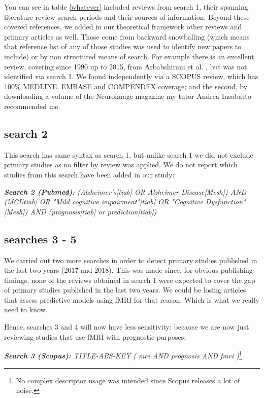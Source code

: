 You can see in table \ref{whatever} included reviews from search 1, their spanning literature-review search periods and their sources of information. Beyond these covered references, we added in our theoretical framework other reviews and primary articles as well. Those come from backward snowballing (which means that reference list of any of those studies was used to identify new papers to include) or by non structured means of search. For example there is an excellent review, covering since 1990 up to 2015, from Arbabshirani et al.                                           \cite{Arbabshirani2017137}, but was not identified via search 1. We found independently via a SCOPUS review, which has 100\% MEDLINE, EMBASE and COMPENDEX coverage; and the second, by downloading a volume of the Neuroimage magazine my tutor Andrea Insabatto recommended me.

\subsection{search 2}
	
This search has same syntax as search 1, but unlike search 1 we did not exclude primary studies as no filter by review was applied. We do not report which studies from this search have been added in our study:
	
		\noindent \textit{\textbf{Search 2 (Pubmed):} (Alzheimer's[tiab] OR Alzheimer Disease[Mesh]) AND (MCI[tiab] OR "Mild cognitive impairment"[tiab] OR "Cognitive Dysfunction"[Mesh]) AND (prognosis[tiab] or prediction[tiab])}

\subsection{searches 3 - 5}
	We carried out two more searches in order to detect primary studies published in the last two years (2017 and 2018). This was made since, for obvious publishing timings, none of the reviews obtained in search 1 were expected to cover the gap of primary studies published in the last two years. We could be losing articles that assess predictive models using fMRI for that reason. Which is what we really need to know.
	
	Hence, searches 3 and 4 will now have less sensitivity: because we are now just reviewing studies that use fMRI with prognostic purposes:
	
		\noindent \textit{\textbf{Search 3 (Scopus):} TITLE-ABS-KEY ( mci  AND  prognosis  AND  fmri )}\footnote{No complex descriptor usage was intended since Scopus releases a lot of noise.}
		
